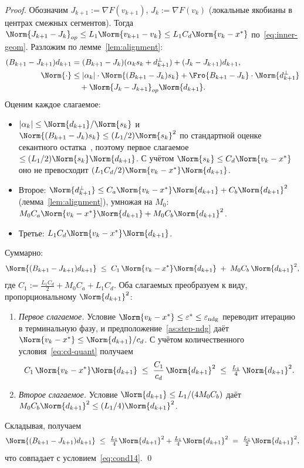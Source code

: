 \begin{proof}
Обозначим $J_{k+1} := \nabla F(v_{k+1})$, $J_k := \nabla F(v_k)$
(локальные якобианы в центрах смежных сегментов).
Тогда $\Norm{J_{k+1} - J_k}_{op} \le L_1 \Norm{v_{k+1} - v_k} \le L_1 C_d \Norm{v_k - x^{*}}$
по~\eqref{eq:inner-geom}. Разложим по лемме~\ref{lem:alignment}:
\begin{align*}
(B_{k+1} - J_{k+1}) d_{k+1}
&= (B_{k+1} - J_k)(\alpha_k s_k + d_{k+1}^{\perp}) + (J_k - J_{k+1}) d_{k+1}, \\
\Norm{\cdot}
&\le |\alpha_k| \cdot \Norm{(B_{k+1} - J_k) s_k}
   + \Fro{B_{k+1} - J_k} \cdot \Norm{d_{k+1}^{\perp}} \\
&\quad{} + \Norm{J_k - J_{k+1}}_{op} \Norm{d_{k+1}}.
\end{align*}
Оценим каждое слагаемое:
\begin{itemize}
\item $|\alpha_k| \le \Norm{d_{k+1}}/\Norm{s_k}$ и $\Norm{(B_{k+1} - J_k) s_k} \le (L_1/2)\Norm{s_k}^2$
      по стандартной оценке секантного остатка~\cite[Lemma~4.1.12]{dennis1996},
      поэтому первое слагаемое $\le (L_1/2)\Norm{s_k}\Norm{d_{k+1}}$.
      С учётом $\Norm{s_k} \le C_d \Norm{v_k - x^{*}}$ оно не превосходит
      $(L_1 C_d / 2)\Norm{v_k - x^{*}}\Norm{d_{k+1}}$.
\item Второе: $\Norm{d_{k+1}^{\perp}} \le C_a \Norm{v_k - x^{*}}\Norm{d_{k+1}} + C_b \Norm{d_{k+1}}^2$
      (лемма~\ref{lem:alignment}), умножая на $M_0$:
      $M_0 C_a \Norm{v_k - x^{*}}\Norm{d_{k+1}} + M_0 C_b \Norm{d_{k+1}}^2$.
\item Третье: $L_1 C_d \Norm{v_k - x^{*}}\Norm{d_{k+1}}$.
\end{itemize}
Суммарно:
\begin{equation}
\Norm{(B_{k+1} - J_{k+1}) d_{k+1}}
\;\le\;
C_1\,\Norm{v_k - x^{*}}\Norm{d_{k+1}}
\;+\; M_0 C_b\,\Norm{d_{k+1}}^2,
\label{eq:cond14-raw-bound}
\end{equation}
где $C_1 := \tfrac{L_1 C_d}{2} + M_0 C_a + L_1 C_d$.
Оба слагаемых преобразуем к виду, пропорциональному $\Norm{d_{k+1}}^2$:
\begin{enumerate}
  \item \emph{Первое слагаемое.} Условие $\Norm{v_k - x^{*}} \le \varepsilon^{*}
        \le \varepsilon_{\mathrm{ndg}}$ переводит итерацию в терминальную фазу,
        и предположение~\ref{as:step-ndg} даёт
        $\Norm{v_k - x^{*}} \le \Norm{d_{k+1}}/c_d$. С учётом
        количественного условия~\eqref{eq:cd-quant} получаем
        \[
        C_1\,\Norm{v_k - x^{*}}\Norm{d_{k+1}}
        \;\le\; \frac{C_1}{c_d}\,\Norm{d_{k+1}}^2
        \;\le\; \tfrac{L_1}{4}\,\Norm{d_{k+1}}^2.
        \]
  \item \emph{Второе слагаемое.} Условие $\Norm{d_{k+1}} \le L_1/(4 M_0 C_b)$
        даёт $M_0 C_b\Norm{d_{k+1}}^2 \le (L_1/4)\Norm{d_{k+1}}^2$.
\end{enumerate}
Складывая, получаем
\[
\Norm{(B_{k+1} - J_{k+1}) d_{k+1}}
\;\le\; \tfrac{L_1}{4}\Norm{d_{k+1}}^2 + \tfrac{L_1}{4}\Norm{d_{k+1}}^2
\;=\; \tfrac{L_1}{2}\Norm{d_{k+1}}^2,
\]
что совпадает с условием~\eqref{eq:cond14}. \qed
\end{proof}

